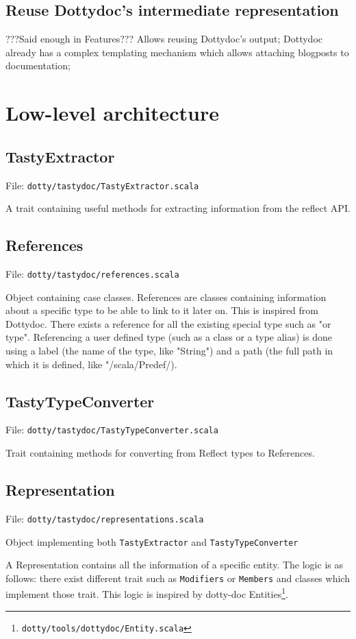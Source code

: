 \documentclass{report}
\begin{document}
\subsection{Reuse Dottydoc's intermediate representation}
???Said enough in Features???
Allows reusing Dottydoc's output;
Dottydoc already has a complex templating mechanism which allows 
attaching blogposts to documentation;

\section{Low-level architecture}
\subsection{TastyExtractor}
File: \texttt{dotty/tastydoc/TastyExtractor.scala}

A trait containing useful methods for extracting information from the reflect API.

\subsection{References}
File: \texttt{dotty/tastydoc/references.scala}

Object containing case classes. References are classes containing information about a specific type to be able to link to it later on. This is inspired from Dottydoc. There exists a reference for all the existing special type such as "or type". Referencing a user defined type (such as a class or a type alias) is done using a label (the name of the type, like "String") and a path (the full path in which it is defined, like "/scala/Predef/).

\subsection{TastyTypeConverter}
File: \texttt{dotty/tastydoc/TastyTypeConverter.scala}

Trait containing methods for converting from Reflect types to References.

\subsection{Representation}
File: \texttt{dotty/tastydoc/representations.scala}

Object implementing both \texttt{TastyExtractor} and \texttt{TastyTypeConverter}

A Representation contains all the information of a specific entity. The logic is as follows: there exist different trait such as \texttt{Modifiers} or \texttt{Members} and classes which implement those trait. This logic is inspired by dotty-doc Entities\footnote{\texttt{dotty/tools/dottydoc/Entity.scala}}.
\end{document}
